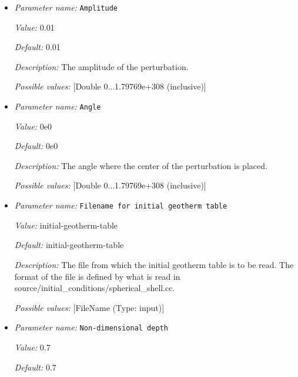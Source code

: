 \begin{itemize}
\item {\it Parameter name:} {\tt Amplitude}
\label{parameters:Initial conditions/Spherical gaussian perturbation/Amplitude}


{\it Value:} 0.01


{\it Default:} 0.01


{\it Description:} The amplitude of the perturbation.


{\it Possible values:} [Double 0...1.79769e+308 (inclusive)]
\item {\it Parameter name:} {\tt Angle}
\label{parameters:Initial conditions/Spherical gaussian perturbation/Angle}


{\it Value:} 0e0


{\it Default:} 0e0


{\it Description:} The angle where the center of the perturbation is placed.


{\it Possible values:} [Double 0...1.79769e+308 (inclusive)]
\item {\it Parameter name:} {\tt Filename for initial geotherm table}
\label{parameters:Initial conditions/Spherical gaussian perturbation/Filename for initial geotherm table}


{\it Value:} initial-geotherm-table


{\it Default:} initial-geotherm-table


{\it Description:} The file from which the initial geotherm table is to be read. The format of the file is defined by what is read in source/initial\_conditions/spherical\_shell.cc.


{\it Possible values:} [FileName (Type: input)]
\item {\it Parameter name:} {\tt Non-dimensional depth}
\label{parameters:Initial conditions/Spherical gaussian perturbation/Non-dimensional depth}


{\it Value:} 0.7


{\it Default:} 0.7



\end{itemize}
